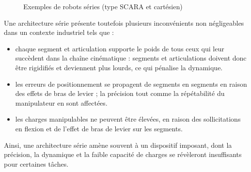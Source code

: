 \begin{figure}[!ht]
  \centering
\hfill
    \caption{\footnotesize{Exemples de robots séries (type SCARA et 
cart\'esien)}}
\label{intro:fig2}
\end{figure}

Une architecture série présente toutefois plusieurs inconvénients non 
négli\-gea\-bles dans un contexte industriel tels que :
\begin{itemize}
 \item chaque segment et articulation supporte le poids de tous ceux qui leur 
succèdent dans la chaîne cinématique : segments et articulations doivent donc 
être rigidifiés et deviennent plus lourds, ce qui pénalise la dynamique.
 \item les erreurs de positionnement se propagent de segments en segments en 
raison des effets de bras de levier ; la précision tout comme la répétabilité du 
manipulateur en sont affectées.
 \item les charges manipulables ne peuvent être \'elev\'ees, en raison des 
sollicitations en flexion et de l'effet de bras de levier sur les segments.
\end{itemize}

Ainsi, une architecture série am\`ene souvent \`a un dispositif imposant, dont 
la précision, la dynamique et la faible capacité de charges se révèleront 
insuffisants pour certaines tâches.

